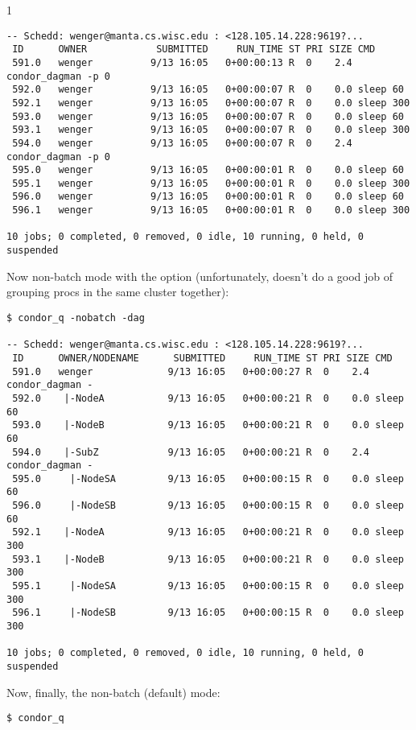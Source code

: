 \begin{ManPage}{\label{man-condor-q}}{1}
\begin{verbatim}
-- Schedd: wenger@manta.cs.wisc.edu : <128.105.14.228:9619?...
 ID      OWNER            SUBMITTED     RUN_TIME ST PRI SIZE CMD
 591.0   wenger          9/13 16:05   0+00:00:13 R  0    2.4 condor_dagman -p 0
 592.0   wenger          9/13 16:05   0+00:00:07 R  0    0.0 sleep 60
 592.1   wenger          9/13 16:05   0+00:00:07 R  0    0.0 sleep 300
 593.0   wenger          9/13 16:05   0+00:00:07 R  0    0.0 sleep 60
 593.1   wenger          9/13 16:05   0+00:00:07 R  0    0.0 sleep 300
 594.0   wenger          9/13 16:05   0+00:00:07 R  0    2.4 condor_dagman -p 0
 595.0   wenger          9/13 16:05   0+00:00:01 R  0    0.0 sleep 60
 595.1   wenger          9/13 16:05   0+00:00:01 R  0    0.0 sleep 300
 596.0   wenger          9/13 16:05   0+00:00:01 R  0    0.0 sleep 60
 596.1   wenger          9/13 16:05   0+00:00:01 R  0    0.0 sleep 300

10 jobs; 0 completed, 0 removed, 0 idle, 10 running, 0 held, 0 suspended
\end{verbatim}
\normalsize

Now non-batch mode with the  option (unfortunately, 
doesn't do a good job of grouping procs in the same cluster together):

\footnotesize
\begin{verbatim}
$ condor_q -nobatch -dag

-- Schedd: wenger@manta.cs.wisc.edu : <128.105.14.228:9619?...
 ID      OWNER/NODENAME      SUBMITTED     RUN_TIME ST PRI SIZE CMD
 591.0   wenger             9/13 16:05   0+00:00:27 R  0    2.4 condor_dagman -
 592.0    |-NodeA           9/13 16:05   0+00:00:21 R  0    0.0 sleep 60
 593.0    |-NodeB           9/13 16:05   0+00:00:21 R  0    0.0 sleep 60
 594.0    |-SubZ            9/13 16:05   0+00:00:21 R  0    2.4 condor_dagman -
 595.0     |-NodeSA         9/13 16:05   0+00:00:15 R  0    0.0 sleep 60
 596.0     |-NodeSB         9/13 16:05   0+00:00:15 R  0    0.0 sleep 60
 592.1    |-NodeA           9/13 16:05   0+00:00:21 R  0    0.0 sleep 300
 593.1    |-NodeB           9/13 16:05   0+00:00:21 R  0    0.0 sleep 300
 595.1     |-NodeSA         9/13 16:05   0+00:00:15 R  0    0.0 sleep 300
 596.1     |-NodeSB         9/13 16:05   0+00:00:15 R  0    0.0 sleep 300

10 jobs; 0 completed, 0 removed, 0 idle, 10 running, 0 held, 0 suspended
\end{verbatim}
\normalsize

Now, finally, the non-batch (default) mode:

\footnotesize
\begin{verbatim}
$ condor_q 


\end{verbatim}
\end{ManPage}
